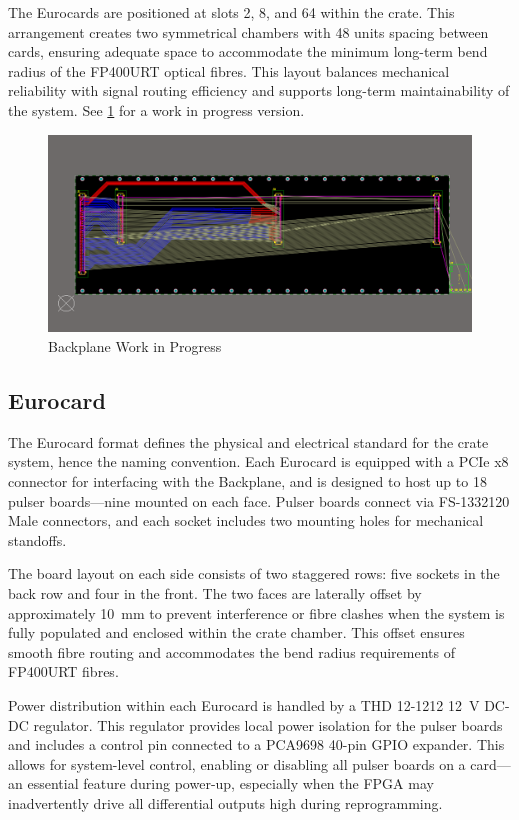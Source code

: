 \documentclass[a4paper,11pt]{article}
\begin{document}
The Eurocards are positioned at slots 2, 8, and 64 within the crate. This arrangement creates two symmetrical chambers with 48 units spacing between cards, ensuring adequate space to accommodate the minimum long-term bend radius of the FP400URT optical fibres. This layout balances mechanical reliability with signal routing efficiency and supports long-term maintainability of the system. See \cref{fig:BackplaneWIP} for a work in progress version.

\begin{figure}[htbp]
\centering
\includegraphics[scale=0.5]{BackplaneWIP.png}
\caption{Backplane Work in Progress\label{fig:BackplaneWIP}}
\end{figure}

\subsection{Eurocard}\label{eurocard}

The Eurocard format defines the physical and electrical standard for the crate system, hence the naming convention. Each Eurocard is equipped with a PCIe x8 connector for interfacing with the Backplane, and is designed to host up to 18 pulser boards—nine mounted on each face. Pulser boards connect via FS-1332120 Male\cite{1332120} connectors, and each socket includes two mounting holes for mechanical standoffs.

The board layout on each side consists of two staggered rows: five sockets in the back row and four in the front. The two faces are laterally offset by approximately \SI{10}{\milli\metre} to prevent interference or fibre clashes when the system is fully populated and enclosed within the crate chamber. This offset ensures smooth fibre routing and accommodates the bend radius requirements of FP400URT fibres.

Power distribution within each Eurocard is handled by a THD 12-1212 \cite{THD121212}\SI{12}{\volt} DC-DC regulator. This regulator provides local power isolation for the pulser boards and includes a control pin connected to a PCA9698 \cite{PCA9698} 40-pin GPIO expander. This allows for system-level control, enabling or disabling all pulser boards on a card—an essential feature during power-up, especially when the FPGA may inadvertently drive all differential outputs high during reprogramming.
\end{document}
